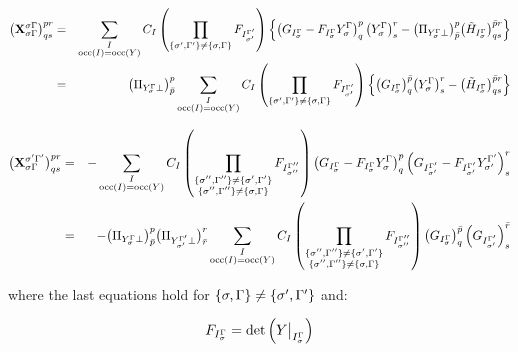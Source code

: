 \begin{eqnarray}
  \big( \mathbf{X}_{\sigma \Gamma}^{\sigma \Gamma} \big)^{pr}_{qs} &=&
  \sum_{\substack{I\\\text{occ}(I) = \text{occ}(Y)}} C_I
  \left( \prod_{\{\sigma', {\Gamma'}\} \ne \{\sigma, \Gamma\}} F_{I_{\sigma'}^{\Gamma'}} \right)
  \left\{ \left( G_{I_\sigma^{\Gamma}} - F_{I_\sigma^{\Gamma}} Y_\sigma^{\Gamma}  \right)^p_q \big( Y_\sigma^{\Gamma} \big)^r_s
  - \big( \Pi_{Y_\sigma^{\Gamma} \perp} \big)^p_{\bar{p}} \big( \tilde{H}_{I_\sigma^{\Gamma}} \big)^{\bar{p}r}_{qs} \right\}\\
  &=&
  \big( \Pi_{Y_\sigma^{\Gamma} \perp} \big)^p_{\bar{p}}
  \sum_{\substack{I\\\text{occ}(I) = \text{occ}(Y)}} C_I
  \left( \prod_{\{\sigma', {\Gamma'}\} \ne \{\sigma, \Gamma\}} F_{I_{\sigma'}^{\Gamma'}} \right)
  \left\{ \big( G_{I_\sigma^{\Gamma}} \big)^{\bar{p}}_q \big( Y_\sigma^{\Gamma} \big)^r_s
  - \big( \tilde{H}_{I_\sigma^{\Gamma}} \big)^{{\bar{p}}r}_{qs} \right\}
\end{eqnarray}

\begin{eqnarray}
  \big( \mathbf{X}_{\sigma \irp}^{\sigma' \irpP} \big)^{pr}_{qs} &=&
  -%
  \sum_{\substack{I\\\text{occ}(I) = \text{occ}(Y)}} C_I
  \left(
    \prod_{\substack{
        \{\sigma'', \irpPP\} \ne \{\sigma', \irpP\} \\
        \{\sigma'', \irpPP\} \ne \{\sigma , \irp \}}}
    F_{I_{\sigma''}^{\irpPP}} \right)
  \left( G_{I_\sigma^\irp} - F_{I_\sigma^\irp} Y_\sigma^\irp  \right)^p_q
  \left( G_{I_{\sigma'}^\irpP} - F_{I_{\sigma'}^\irpP} Y_{\sigma'}^\irpP \right)^r_s\\
  &=&
  -%
  \big( \Pi_{Y_\sigma^\irp \perp} \big)^p_{\bar{p}}
  \big( \Pi_{Y_{\sigma'}^\irpP \perp} \big)^r_{\bar{r}}
  \sum_{\substack{I\\\text{occ}(I) = \text{occ}(Y)}} C_I
  \left(
    \prod_{\substack{
        \{\sigma'', \irpPP\} \ne \{\sigma', \irpP\} \\
        \{\sigma'', \irpPP\} \ne \{\sigma , \irp \}}}
    F_{I_{\sigma''}^{\irpPP}} \right)
  \left( G_{I_\sigma^\irp}  \right)^{\bar{p}}_q
  \left( G_{I_{\sigma'}^\irpP} \right)^{\bar{r}}_s
\end{eqnarray}

where the last equations hold for ${\{\sigma,\Gamma\} \ne \{\sigma',{\Gamma'}\}}$ and:

\begin{equation}
  F_{I_\sigma^{\Gamma}} = \text{det} \left( Y\big|_{I_\sigma^{\Gamma}} \right)
\end{equation}

